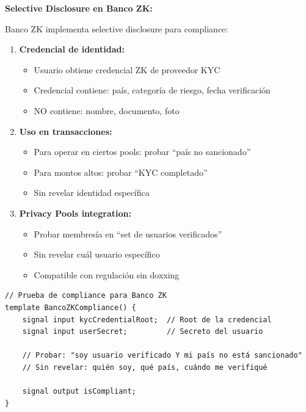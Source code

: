 \documentclass[11pt,a4paper,twoside]{book}
\theoremstyle{definition}
\theoremstyle{remark}
\begin{document}
\begin{bancozk}
\textbf{Selective Disclosure en Banco ZK:}

Banco ZK implementa selective disclosure para compliance:

\begin{enumerate}
    \item \textbf{Credencial de identidad:}
    \begin{itemize}
        \item Usuario obtiene credencial ZK de proveedor KYC
        \item Credencial contiene: país, categoría de riesgo, fecha verificación
        \item NO contiene: nombre, documento, foto
    \end{itemize}
    
    \item \textbf{Uso en transacciones:}
    \begin{itemize}
        \item Para operar en ciertos pools: probar ``país no sancionado''
        \item Para montos altos: probar ``KYC completado''
        \item Sin revelar identidad específica
    \end{itemize}
    
    \item \textbf{Privacy Pools integration:}
    \begin{itemize}
        \item Probar membresía en ``set de usuarios verificados''
        \item Sin revelar cuál usuario específico
        \item Compatible con regulación sin doxxing
    \end{itemize}
\end{enumerate}

\begin{lstlisting}[language=circom]
// Prueba de compliance para Banco ZK
template BancoZKCompliance() {
    signal input kycCredentialRoot;  // Root de la credencial
    signal input userSecret;         // Secreto del usuario
    
    // Probar: "soy usuario verificado Y mi país no está sancionado"
    // Sin revelar: quién soy, qué país, cuándo me verifiqué
    
    signal output isCompliant;
}
\end{lstlisting}
\end{bancozk}
\end{document}
